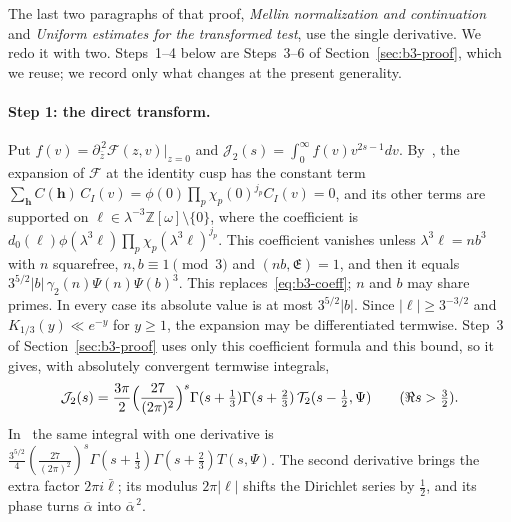 \documentclass[11pt]{article}
\numberwithin{equation}{section}
\newcommand{\OO}{\mathbb Z[\omega]}
\begin{document}
The last two paragraphs of that proof, \emph{Mellin normalization and continuation} and \emph{Uniform estimates for
the transformed test}, use the single derivative. We redo it with two. Steps~1--4 below are Steps~3--6 of
Section~\ref{sec:b3-proof}, which we reuse; we record only what changes at the present generality.

\paragraph{Step 1: the direct transform.} Put $f(v)=\partial_{\bar z}^{\,2}\mathcal F(z,v)\big|_{z=0}$ and
$\mathcal J_2(s)=\int_0^\infty f(v)v^{2s-1}dv$. By~\cite[proof of Proposition~5.1, \emph{Finite Fourier inversion with the zero extensions}]{OAI78}, the expansion of $\mathcal F$ at the
identity cusp has the constant term $\sum_{\mathbf h}C(\mathbf h)\,C_I(v)=\phi(0)\prod_p\chi_p(0)^{j_p}C_I(v)=0$, and its
other terms are supported on $\ell\in\lambda^{-3}\OO\setminus\{0\}$, where the coefficient is
$d_0(\ell)\phi(\lambda^3\ell)\prod_p\chi_p(\lambda^3\ell)^{j_p}$. This coefficient vanishes unless $\lambda^3\ell=nb^3$
with $n$ squarefree, $n,b\equiv1\pmod3$ and $(nb,\mathfrak E)=1$, and then it equals
$3^{5/2}|b|\,\gamma_2(n)\Psi(n)\Psi(b)^3$. This replaces~\eqref{eq:b3-coeff}; $n$ and $b$ may share primes. In every
case its absolute value is at most $3^{5/2}|b|$. Since $|\ell|\ge3^{-3/2}$ and $K_{1/3}(y)\ll e^{-y}$ for $y\ge1$, the
expansion may be differentiated termwise. Step~3 of Section~\ref{sec:b3-proof} uses only this coefficient formula and
this bound, so it gives, with absolutely convergent termwise integrals,
\begin{equation}\label{eq:s1-direct}
 \mathcal J_2(s)=\frac{3\pi}2\Bigl(\frac{27}{(2\pi)^2}\Bigr)^s\Gamma(s+\tfrac13)\Gamma(s+\tfrac23)\,
 \mathcal T_2(s-\tfrac12,\Psi)\qquad(\Re s>\tfrac32).
\end{equation}
In~\cite[eq.~(5.18)]{OAI78} the same integral with one derivative is
$\frac{3^{5/2}}4(\frac{27}{(2\pi)^2})^s\Gamma(s+\frac13)\Gamma(s+\frac23)T(s,\Psi)$. The second derivative brings
the extra factor $2\pi i\bar\ell$; its modulus $2\pi|\ell|$ shifts the Dirichlet series by $\frac12$, and its
phase turns $\overline\alpha$ into $\overline\alpha^{\,2}$.
\end{document}
